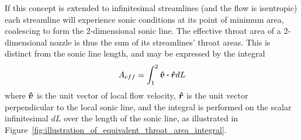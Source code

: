 \documentclass[a4paper, 11pt, oneside]{report}
\begin{document}
If this concept is extended to infinitesimal streamlines (and the flow is isentropic) each streamline will experience sonic conditions at its point of minimum area, coalescing to form the 2-dimensional sonic line. The effective throat area of a 2-dimensional nozzle is thus the sum of its streamlines' throat areas. This is distinct from the sonic line length, and may be expressed by the integral
\begin{equation}\label{effective_throat_area_integral}
	A_{eff} = 
	\int_{1}^2 \vu*{v} \vdot \vu*{r} dL
\end{equation}
where $\vu*{v}$ is the unit vector of local flow velocity, $\vu*{r}$ is the unit vector perpendicular to the local sonic line, and the integral is performed on the scalar infinitesimal $dL$ over the length of the sonic line, as illustrated in Figure~\ref{fig:illustration_of_equivalent_throat_area_integral}.
 		
\end{document}

